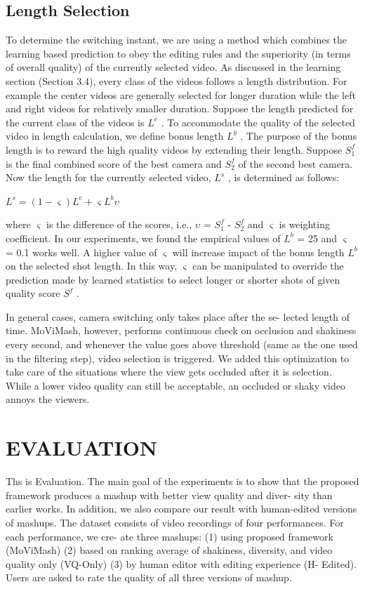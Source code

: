 \documentclass{sig-alternate-05-2015}
\begin{document}
\subsection{Length Selection}
To determine the switching instant, we are using a method which
combines the learning based prediction to obey the editing rules and
the superiority (in terms of overall quality) of the currently selected
video. As discussed in the learning section (Section 3.4), every
class of the videos follows a length distribution. For example the
center videos are generally selected for longer duration while the
left and right videos for relatively smaller duration.
Suppose the length predicted for the current class of the videos
is $L^e$ . To accommodate the quality of the selected video in length
calculation, we define bonus length $L^b$ . The purpose of the bonus
length is to reward the high quality videos by extending their length.
Suppose $S_1^f$ is the final combined score of the best camera and $S_2^f$
of the second best camera. Now the length for the currently selected
video, $L^s$ , is determined as follows:
\begin{center}
$L^s = (1 - \varsigma )L^e + \varsigma L^b \upsilon$
\end{center}
where $\varsigma$ is the difference of the scores, i.e., $\upsilon$ = $S_1^f$ - $S_2^f$
and  $\varsigma$ is
weighting coefficient. In our experiments, we found the empirical
values of $L^b$ = 25 and  $\varsigma$ = 0.1 works well. A higher value of
 $\varsigma$ will increase impact of the bonus length $L^b$ on the selected shot
length. In this way, $\varsigma$ can be manipulated to override the prediction
made by learned statistics to select longer or shorter shots of given
quality score $S^f$ .

In general cases, camera switching only takes place after the se-
lected length of time. MoViMash, however, performs continuous
check on occlusion and shakiness every second, and whenever the
value goes above threshold (same as the one used in the filtering
step), video selection is triggered. We added this optimization to
take care of the situations where the view gets occluded after it is
selection. While a lower video quality can still be acceptable, an
occluded or shaky video annoys the viewers.
\section{EVALUATION}
Ths is Evaluation.
The main goal of the experiments is to show that the proposed
framework produces a mashup with better view quality and diver-
sity than earlier works. In addition, we also compare our result with
human-edited versions of mashups. The dataset consists of video
recordings of four performances. For each performance, we cre-
ate three mashups: (1) using proposed framework (MoViMash) (2)
based on ranking average of shakiness, diversity, and video quality only (VQ-Only) (3) by human editor with editing experience (H-
Edited). Users are asked to rate the quality of all three versions of
mashup.
\end{document}
